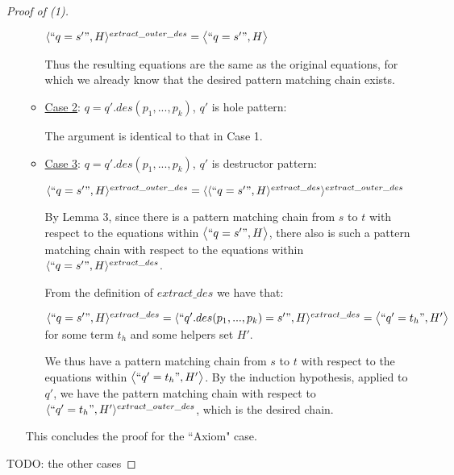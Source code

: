 \documentclass[11pt]{article} %
\begin{document}
\begin{proof}[Proof of (1)]
\begin{enumerate}
\begin{itemize}
$\langle `` q = s' ", H \rangle^{extract\_outer\_des} = \big\langle `` q = s' ", H \big\rangle$

Thus the resulting equations are the same as the original equations, for which we already know that the desired pattern matching chain exists.

\item \underline{Case 2}: $q = q'.des(p_1, ..., p_k)$, $q'$ is hole pattern:

The argument is identical to that in Case 1.

\item \underline{Case 3}: $q = q'.des(p_1, ..., p_k)$, $q'$ is destructor pattern:

$\langle `` q = s' ", H \rangle^{extract\_outer\_des} = \langle \langle `` q = s' ", H \rangle^{extract\_des} \rangle^{extract\_outer\_des}$

By Lemma 3, since there is a pattern matching chain from $s$ to $t$ with respect to the equations within $\big\langle `` q = s' ", H \big\rangle$, there also is such a pattern matching chain with respect to the equations within $\langle `` q = s' ", H \rangle^{extract\_des}$. 

From the definition of $extract\_des$ we have that:

$\langle `` q = s' ", H \rangle^{extract\_des} = \langle `` q'.des(p_1, ..., p_k) = s' ", H \rangle^{extract\_des} = \big\langle `` q' = t_h ", H' \big\rangle$ for some term $t_h$ and some helpers set $H'$. 

We thus have a pattern matching chain from $s$ to $t$ with respect to the equations within $\big\langle `` q' = t_h ", H' \big\rangle$. By the induction hypothesis, applied to $q'$, we have the pattern matching chain with respect to $\langle `` q' = t_h ", H' \rangle^{extract\_outer\_des}$, which is the desired chain.

\end{itemize}

This concludes the proof for the ``Axiom" case.

\end{enumerate}

TODO: the other cases

\end{proof}
\end{document}
